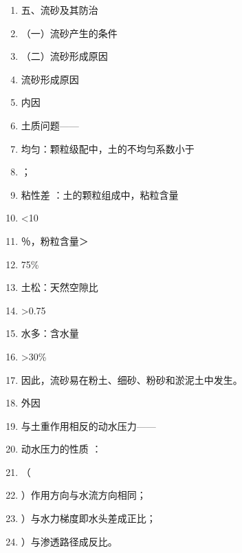 \documentclass[UTF8,fontset=fandol,11pt]{ctexart}
\begin{document}
\begin{enumerate}[label=\arabic*.]

\item 五、流砂及其防治

\item （一）流砂产生的条件

\item （二）流砂形成原因

\item 流砂形成原因

\item 内因

\item 土质问题——

\item 均匀：颗粒级配中，土的不均匀系数小于

\item ；

\item 粘性差 ：土的颗粒组成中，粘粒含量

\item <10

\item ％，粉粒含量＞

\item 75\%

\item 土松：天然空隙比

\item >0.75

\item 水多：含水量

\item >30\%

\item 因此，流砂易在粉土、细砂、粉砂和淤泥土中发生。

\item 外因

\item 与土重作用相反的动水压力——

\item 动水压力的性质 ：

\item （

\item ）作用方向与水流方向相同；

\item ）与水力梯度即水头差成正比；

\item ）与渗透路径成反比。

\end{enumerate}
\end{document}
